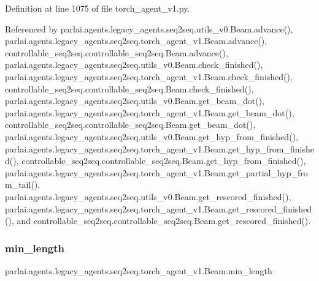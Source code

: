 Definition at line 1075 of file torch\+\_\+agent\+\_\+v1.\+py.



Referenced by parlai.\+agents.\+legacy\+\_\+agents.\+seq2seq.\+utils\+\_\+v0.\+Beam.\+advance(), parlai.\+agents.\+legacy\+\_\+agents.\+seq2seq.\+torch\+\_\+agent\+\_\+v1.\+Beam.\+advance(), controllable\+\_\+seq2seq.\+controllable\+\_\+seq2seq.\+Beam.\+advance(), parlai.\+agents.\+legacy\+\_\+agents.\+seq2seq.\+utils\+\_\+v0.\+Beam.\+check\+\_\+finished(), parlai.\+agents.\+legacy\+\_\+agents.\+seq2seq.\+torch\+\_\+agent\+\_\+v1.\+Beam.\+check\+\_\+finished(), controllable\+\_\+seq2seq.\+controllable\+\_\+seq2seq.\+Beam.\+check\+\_\+finished(), parlai.\+agents.\+legacy\+\_\+agents.\+seq2seq.\+utils\+\_\+v0.\+Beam.\+get\+\_\+beam\+\_\+dot(), parlai.\+agents.\+legacy\+\_\+agents.\+seq2seq.\+torch\+\_\+agent\+\_\+v1.\+Beam.\+get\+\_\+beam\+\_\+dot(), controllable\+\_\+seq2seq.\+controllable\+\_\+seq2seq.\+Beam.\+get\+\_\+beam\+\_\+dot(), parlai.\+agents.\+legacy\+\_\+agents.\+seq2seq.\+utils\+\_\+v0.\+Beam.\+get\+\_\+hyp\+\_\+from\+\_\+finished(), parlai.\+agents.\+legacy\+\_\+agents.\+seq2seq.\+torch\+\_\+agent\+\_\+v1.\+Beam.\+get\+\_\+hyp\+\_\+from\+\_\+finished(), controllable\+\_\+seq2seq.\+controllable\+\_\+seq2seq.\+Beam.\+get\+\_\+hyp\+\_\+from\+\_\+finished(), parlai.\+agents.\+legacy\+\_\+agents.\+seq2seq.\+torch\+\_\+agent\+\_\+v1.\+Beam.\+get\+\_\+partial\+\_\+hyp\+\_\+from\+\_\+tail(), parlai.\+agents.\+legacy\+\_\+agents.\+seq2seq.\+utils\+\_\+v0.\+Beam.\+get\+\_\+rescored\+\_\+finished(), parlai.\+agents.\+legacy\+\_\+agents.\+seq2seq.\+torch\+\_\+agent\+\_\+v1.\+Beam.\+get\+\_\+rescored\+\_\+finished(), and controllable\+\_\+seq2seq.\+controllable\+\_\+seq2seq.\+Beam.\+get\+\_\+rescored\+\_\+finished().

\mbox{\label{classparlai_1_1agents_1_1legacy__agents_1_1seq2seq_1_1torch__agent__v1_1_1Beam_a9c3bd0baa9376a027dabbbe43c6aac5e}} 
\subsubsection{\texorpdfstring{min\+\_\+length}{min\_length}}
{\footnotesize\ttfamily parlai.\+agents.\+legacy\+\_\+agents.\+seq2seq.\+torch\+\_\+agent\+\_\+v1.\+Beam.\+min\+\_\+length}



